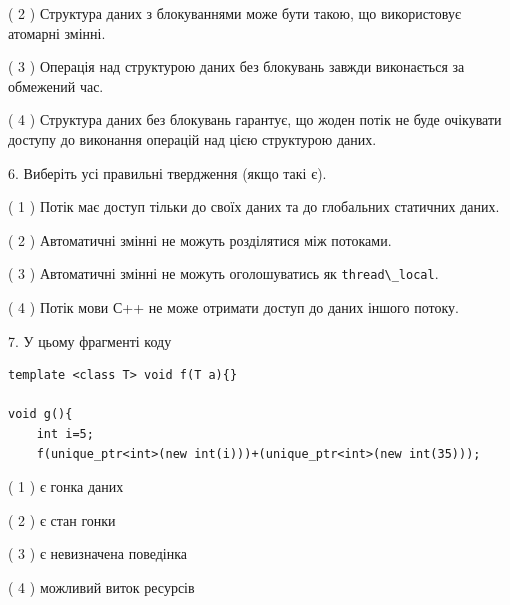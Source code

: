 \documentclass[12pt, ukrainian]{article}
\def\code#1{\Verb!#1!}
\begin{document}
\begin {large}
{( 2 ) Структура даних з блокуваннями може бути такою, що використовує атомарні змінні.%

( 3 ) Операція над структурою даних без блокувань завжди виконається за обмежений час.%

( 4 ) Структура даних без блокувань гарантує, що жоден потік не буде очікувати доступу до виконання операцій над цією структурою даних.%
\newpage



\vspace{5mm}
6. Виберіть усі правильні твердження (якщо такі є).\par
\vspace{2mm}

( 1 ) Потік має доступ тільки до своїх даних та до глобальних статичних даних.%

( 2 ) Автоматичні змінні не можуть розділятися між потоками.%

( 3 ) Автоматичні змінні не можуть оголошуватись як \code{thread\_local}.%

( 4 ) Потік мови С++ не може отримати доступ до даних іншого потоку.%


\vspace{5mm}
7. У цьому фрагменті коду
\begin{verbatim}
template <class T> void f(T a){}

void g(){
    int i=5;
    f(unique_ptr<int>(new int(i)))+(unique_ptr<int>(new int(35)));
\end{verbatim}
( 1 ) є гонка даних%

( 2 ) є стан гонки%

( 3 ) є невизначена поведінка%

( 4 ) можливий виток ресурсів%
}
\end {large}
\end{document}

